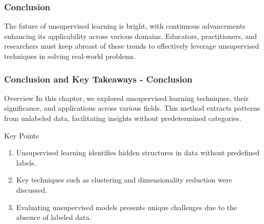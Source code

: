 \documentclass[aspectratio=169]{beamer}
\begin{document}
\begin{frame}[fragile]
    \frametitle{Conclusion}
    The future of unsupervised learning is bright, with continuous advancements enhancing its applicability across various domains. Educators, practitioners, and researchers must keep abreast of these trends to effectively leverage unsupervised techniques in solving real-world problems.
\end{frame}

\begin{frame}[fragile]
    \frametitle{Conclusion and Key Takeaways - Conclusion}
    \begin{block}{Overview}
        In this chapter, we explored unsupervised learning techniques, their significance, and applications across various fields. This method extracts patterns from unlabeled data, facilitating insights without predetermined categories.
    \end{block}
    
    \begin{block}{Key Points}
        \begin{enumerate}
            \item Unsupervised learning identifies hidden structures in data without predefined labels.
            \item Key techniques such as clustering and dimensionality reduction were discussed.
            \item Evaluating unsupervised models presents unique challenges due to the absence of labeled data.
        \end{enumerate}
    \end{block}
\end{frame}
\end{document}

